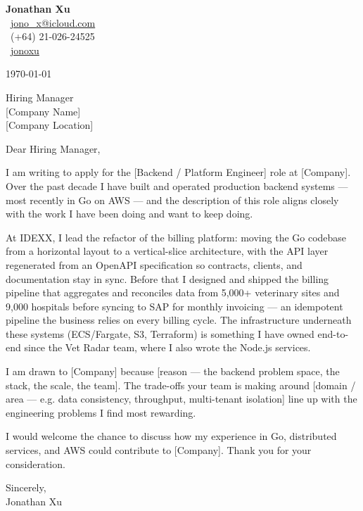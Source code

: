 \documentclass[11pt,a4paper]{article}
\begin{document}
\begin{flushright}
{\Large\textbf{Jonathan Xu}}\\[0.3em]
\faEnvelope\ \href{mailto:jono_x@icloud.com}{jono\_x@icloud.com} \\
\faPhone\ (+64) 21-026-24525 \\
\faLinkedin\ \href{https://www.linkedin.com/in/jonathan-x-4aba55115}{jonoxu}
\end{flushright}

\vspace{0.5em}

\today

\vspace{0.5em}

Hiring Manager \\
{[Company Name]} \\
{[Company Location]}

\vspace{0.5em}

Dear Hiring Manager,

I am writing to apply for the [Backend / Platform Engineer] role at [Company]. Over the past decade I have built and operated production backend systems — most recently in Go on AWS — and the description of this role aligns closely with the work I have been doing and want to keep doing.

At IDEXX, I lead the refactor of the billing platform: moving the Go codebase from a horizontal layout to a vertical-slice architecture, with the API layer regenerated from an OpenAPI specification so contracts, clients, and documentation stay in sync. Before that I designed and shipped the billing pipeline that aggregates and reconciles data from 5,000+ veterinary sites and 9,000 hospitals before syncing to SAP for monthly invoicing — an idempotent pipeline the business relies on every billing cycle. The infrastructure underneath these systems (ECS/Fargate, S3, Terraform) is something I have owned end-to-end since the Vet Radar team, where I also wrote the Node.js services.

I am drawn to [Company] because [reason — the backend problem space, the stack, the scale, the team]. The trade-offs your team is making around [domain / area — e.g. data consistency, throughput, multi-tenant isolation] line up with the engineering problems I find most rewarding.

I would welcome the chance to discuss how my experience in Go, distributed services, and AWS could contribute to [Company]. Thank you for your consideration.

\vspace{0.5em}

Sincerely, \\
Jonathan Xu
\end{document}
